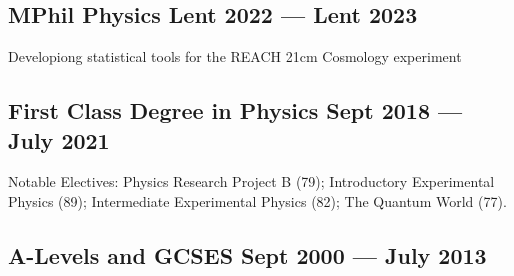 \subsection{{MPhil Physics \hfill Lent 2022 --- Lent 2023}}
\begin{zitemize}
    \item Developiong statistical tools for the REACH 21cm Cosmology experiment
\vspace{7px}
\end{zitemize}
\subsection{{First Class Degree in Physics \hfill Sept 2018 --- July 2021}}

\begin{zitemize} 
\item Notable Electives: Physics Research Project B (79); Introductory Experimental Physics
(89); Intermediate Experimental Physics (82); The Quantum World (77).
\end{zitemize}

\subsection{{A-Levels and GCSES  \hfill Sept 2000 --- July 2013}}
\vspace{5px}

